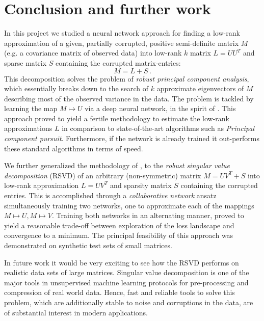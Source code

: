 \newpage
\section{Conclusion and further work}\label{sec:outlook}

In this project we studied a neural network approach for finding a low-rank approximation of a given, partially corrupted, positive semi-definite matrix $M$ (e.g. a covariance matrix of observed data) into low-rank $k$ matrix $L = UU^T$ and sparse matrix $S$ containing the corrupted matrix-entries:
\[
M = L + S \,.
\]
This decomposition solves the problem of \textit{robust principal component analysis}, which essentially breaks down to the search of $k$ approximate eigenvectors of $M$ describing most of the observed variance in the data. The problem is tackled by learning the map $M \mapsto U$ via a deep neural network, in the spirit of \cite{herrera2020denise}. This approach proved to yield a fertile methodology to estimate the low-rank approximations $L$ in comparison to state-of-the-art algorithms such as \textit{Principal component pursuit}. Furthermore, if the network is already trained it out-performs these standard algorithms in terms of speed.

We further generalized the methodology of \cite{herrera2020denise}, to the \textit{robust singular value decomposition} (RSVD) of an arbitrary (non-symmetric) matrix $M = UV^T + S$ into low-rank approximation $L = UV^T$ and sparsity matrix $S$ containing the corrupted entries. This is accomplished through a \textit{collaborative network} ansatz simultaneously training two networks, one to approximate each of the mappings $M\mapsto U, M\mapsto V$. Training both networks in an alternating manner, proved to yield a reasonable trade-off between exploration of the loss landscape and convergence to a minimum. The principal feasibility of this approach was demonstrated on synthetic test sets of small matrices.

In future work it would be very exciting to see how the RSVD performs on realistic data sets of large matrices. Singular value decomposition is one of the major tools in unsupervised machine learning protocols for pre-processing and compression of real world data. Hence, fast and reliable tools to solve this problem, which are additionally stable to noise and corruptions in the data, are of substantial interest in modern applications.

